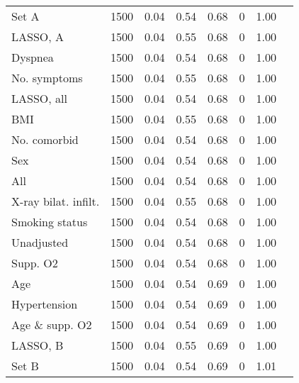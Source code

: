 \documentclass{article}
\begin{document}
{\begin{longtable}{lccccccc}
Set A & 1500 & 0.04 & 0.54 & 0.68 & 0 & 1.00\\
LASSO, A & 1500 & 0.04 & 0.55 & 0.68 & 0 & 1.00\\
Dyspnea & 1500 & 0.04 & 0.54 & 0.68 & 0 & 1.00\\
No. symptoms & 1500 & 0.04 & 0.55 & 0.68 & 0 & 1.00\\
LASSO, all & 1500 & 0.04 & 0.54 & 0.68 & 0 & 1.00\\
BMI & 1500 & 0.04 & 0.55 & 0.68 & 0 & 1.00\\
No. comorbid & 1500 & 0.04 & 0.54 & 0.68 & 0 & 1.00\\
Sex & 1500 & 0.04 & 0.54 & 0.68 & 0 & 1.00\\
All & 1500 & 0.04 & 0.54 & 0.68 & 0 & 1.00\\
X-ray bilat. infilt. & 1500 & 0.04 & 0.55 & 0.68 & 0 & 1.00\\
Smoking status & 1500 & 0.04 & 0.54 & 0.68 & 0 & 1.00\\
Unadjusted & 1500 & 0.04 & 0.54 & 0.68 & 0 & 1.00\\
Supp. O2 & 1500 & 0.04 & 0.54 & 0.68 & 0 & 1.00\\
Age & 1500 & 0.04 & 0.54 & 0.69 & 0 & 1.00\\
Hypertension & 1500 & 0.04 & 0.54 & 0.69 & 0 & 1.00\\
Age \& supp. O2 & 1500 & 0.04 & 0.54 & 0.69 & 0 & 1.00\\
LASSO, B & 1500 & 0.04 & 0.55 & 0.69 & 0 & 1.00\\
Set B & 1500 & 0.04 & 0.54 & 0.69 & 0 & 1.01\\
\bottomrule
\hline
\end{longtable}
}

\clearpage
\end{document}
